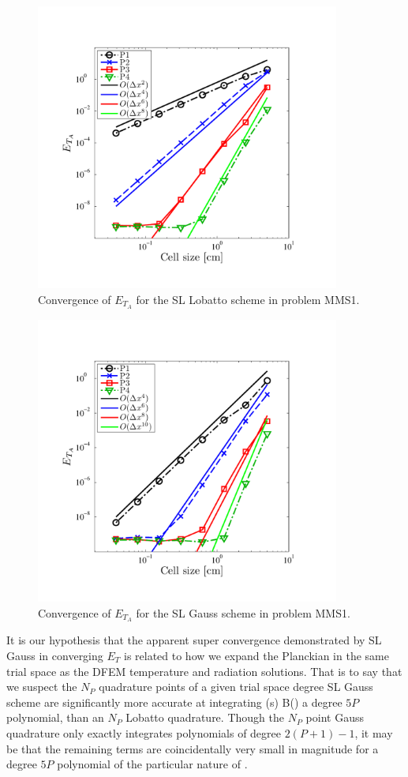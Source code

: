 \begin{figure}[!htp]
\centering
\includegraphics[width=10cm,trim=0.25in  0.5in 0.75in 0.75in,clip=true]{chapter6_grey_radtran/Dissertation_Data/MMS2_SLXS_Lobatto_temp_A.pdf}
\caption{Convergence of $E_{T_A}$ for the SL Lobatto scheme in problem MMS1.}
\label{fig:mms1_lobatto_temp_A}
\end{figure}
%
%
\begin{figure}[!hbp]
\centering
\includegraphics[width=10cm,trim=0.25in  0.5in 0.75in 0.75in,clip=true]{chapter6_grey_radtran/Dissertation_Data/MMS2_SLXS_Gauss_temp_A.pdf}
\caption{Convergence of $E_{T_A}$ for the SL Gauss scheme in problem MMS1.}
\label{fig:mms1_gauss_temp_A}
\end{figure}

It is our hypothesis that the apparent super convergence demonstrated by SL Gauss in converging $E_T$ is related to how we expand the Planckian in the same trial space as the DFEM temperature and radiation solutions. 
That is to say that we suspect the $N_P$ quadrature points of a given trial space degree SL Gauss scheme are significantly more accurate at integrating 
\benum
{}(s) B() \pec
\label{eq:planck_int}
\eenum
a degree $5P$ polynomial, than an $N_P$ Lobatto quadrature.
Though the $N_P$ point Gauss quadrature only exactly integrates polynomials of degree $2(P+1) -1$, it may be that the remaining terms are coincidentally very small in magnitude for a degree $5P$ polynomial of the particular nature of .


